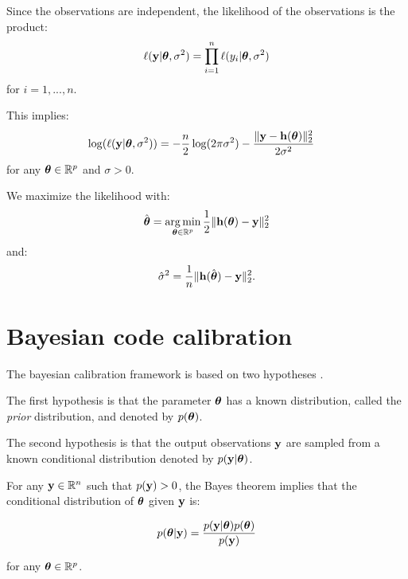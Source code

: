 \documentclass{beamer}
\begin{document}

\begin{frame}
Since the observations are independent, the likelihood of the observations is 
the product:
$$
\ell({\bf y}|\boldsymbol{\theta},\sigma^2) = 
\prod_{i=1}^n \ell(y_i|\boldsymbol{\theta},\sigma^2)
$$
for $i=1,...,n$. 

This implies:
\begin{align*}
\log(\ell({\bf y}|\boldsymbol{\theta},\sigma^2)) 
&= -\frac{n}{2} \log(2\pi \sigma^2)
-\frac{\|{\bf y} - {\bf h}(\boldsymbol{\theta})\|_2^2}{2 \sigma^2}
\end{align*}
for any $\boldsymbol{\theta}\in\mathbb{R}^p$ and $\sigma>0$. 

We maximize the likelihood with:
\begin{align*}
\hat{\boldsymbol{\theta}}
= \operatorname*{arg\,min}_{\boldsymbol{\theta}\in\mathbb{R}^p} \frac{1}{2} \| {\bf h}(\boldsymbol{\theta}) - {\bf y}\|_2^2
\end{align*}
and:
\begin{align*}
\hat{\sigma}^2
= \frac{1}{n} \| {\bf h}(\hat{\boldsymbol{\theta}}) - {\bf y}\|_2^2.
\end{align*}

\end{frame}

\section{Bayesian code calibration}

\begin{frame}

The bayesian calibration framework is based on two hypotheses 
\cite{Tarantola2005, Asch2016}.

The first hypothesis is that the parameter $\boldsymbol{\theta}$ has a
known distribution, called the \emph{prior} distribution, and denoted by
$p(\boldsymbol{\theta})$.

The second hypothesis is that the output observations
${\bf y}$ are sampled from a known
conditional distribution denoted by $p({\bf y} | \boldsymbol{\theta})$.

For any ${\bf y}\in\mathbb{R}^{n}$ such that $p({\bf y})>0$,
the Bayes theorem implies that the conditional distribution of
$\boldsymbol{\theta}$ given ${\bf y}$ is:

$$
p(\boldsymbol{\theta} | {\bf y}) = \frac{p({\bf y} | \boldsymbol{\theta}) p(\boldsymbol{\theta})}{p({\bf y})}
$$

for any $\boldsymbol{\theta}\in\mathbb{R}^p$.

\end{frame}
\end{document}

